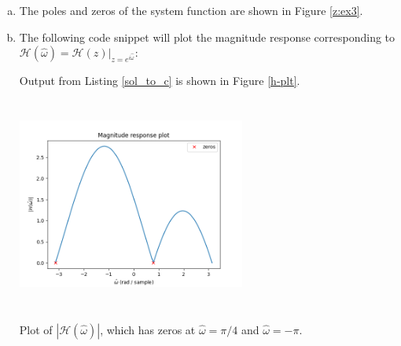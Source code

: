 \begin{enumerate}
\begin{enumerate}[a)]
\begin{marginfigure}[-5cm]
\begin{center}
\end{center}
\caption{The zeros of the system function $\mathcal{H}(z)$,
have $\alpha_k=\{e^{i\pi/4},e^{-i\pi}\}$. Zeros are marked with blue
    circles and poles are marked with red crosses.}
\label{z:ex3}
\end{marginfigure}

\item The poles and zeros of the system function are shown in Figure \ref{z:ex3}. 

\item The following code snippet will plot the magnitude response corresponding to $\mathcal{H}(\hat{\omega})=\mathcal{H}(z)|_{z=e^{i\hat{\omega}}}$:

Output from Listing \ref{sol_to_c} is shown in Figure \ref{h-plt}.

\begin{marginfigure}
\includegraphics[width=7.5cm,height=7.0cm]{ch18/figures/magnituderes.png}
\caption{Plot of $|\mathcal{H}(\hat{\omega})|$, which has zeros at $\hat{\omega}=\pi/4$ and $\hat{\omega}=-\pi$.}
\label{h-plt}
\end{marginfigure}


\end{enumerate}
\end{enumerate}
